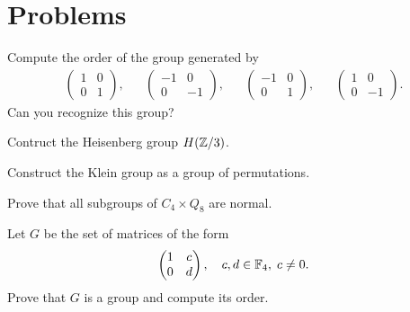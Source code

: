 



\section{Problems}


\begin{prob}
Compute the order of the group generated by
\begin{align*}
    \begin{pmatrix}
        1 & 0\\
        0 & 1
    \end{pmatrix},
    &&
    \begin{pmatrix}
        -1 & 0\\
        0 & -1
    \end{pmatrix},
    &&
    \begin{pmatrix}
        -1 & 0\\
        0 & 1
    \end{pmatrix},
    &&
    \begin{pmatrix}
        1 & 0\\
        0 & -1
    \end{pmatrix}.
\end{align*}
Can you recognize this group?
\end{prob}

\begin{prob}
  Contruct the Heisenberg group $H(\mathbb{Z}/3)$.
\end{prob}

\begin{prob}
  Construct the Klein group as a group of permutations.
\end{prob}

\begin{prob}
    Prove that all subgroups of $C_4\times Q_8$ are normal.
\end{prob}

\begin{prob}
    Let $G$ be the set of matrices of the form
    \[
        \begin{pmatrix}
            1&c\\
            0&d
        \end{pmatrix},
        \quad
        c,d\in\mathbb{F}_4,\;c\ne0.
    \]
    Prove that $G$ is a group and compute its order. 
\end{prob}

